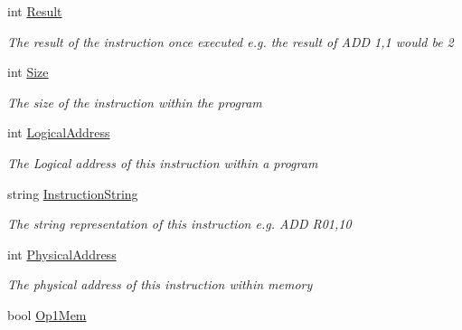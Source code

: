 \begin{DoxyCompactItemize}
int \hyperlink{class_c_p_u___o_s___simulator_1_1_c_p_u_1_1_instruction_a8e0f7c63850af7cfd8a41c066c01838e}{Result}
\begin{DoxyCompactList}\small\item\em The result of the instruction once executed e.\+g. the result of A\+D\+D 1,1 would be 2 \end{DoxyCompactList}\item 
int \hyperlink{class_c_p_u___o_s___simulator_1_1_c_p_u_1_1_instruction_a7c60418808e7bd6cb1964a227dcd9dac}{Size}
\begin{DoxyCompactList}\small\item\em The size of the instruction within the program \end{DoxyCompactList}\item 
int \hyperlink{class_c_p_u___o_s___simulator_1_1_c_p_u_1_1_instruction_abfc23dbc9a978d2a1468b819f87a7614}{Logical\+Address}
\begin{DoxyCompactList}\small\item\em The Logical address of this instruction within a program \end{DoxyCompactList}\item 
string \hyperlink{class_c_p_u___o_s___simulator_1_1_c_p_u_1_1_instruction_a2750b111d827f6e6a8fccd0e8520de89}{Instruction\+String}
\begin{DoxyCompactList}\small\item\em The string representation of this instruction e.\+g. A\+D\+D R01,10 \end{DoxyCompactList}\item 
int \hyperlink{class_c_p_u___o_s___simulator_1_1_c_p_u_1_1_instruction_a97b20c8a0a7536bdddd8e791605a8bac}{Physical\+Address}
\begin{DoxyCompactList}\small\item\em The physical address of this instruction within memory \end{DoxyCompactList}\item 
bool \hyperlink{class_c_p_u___o_s___simulator_1_1_c_p_u_1_1_instruction_ae5666173d24e27d25d16e1e1f0bb10a3}{Op1\+Mem}

\end{DoxyCompactItemize}
